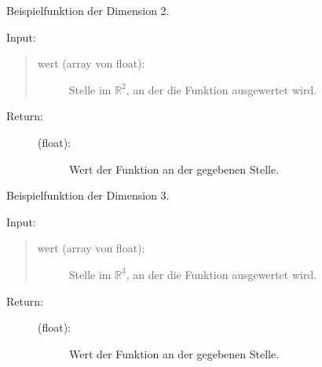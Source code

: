 \documentclass[letterpaper,10pt,ngerman, oneside, openright]{sphinxmanual}
\begin{document}
\begin{fulllineitems}
\label{\detokenize{index:aufg_5_2.fntn2}}
Beispielfunktion der Dimension 2.
\begin{description}
\item [{Input:}]
\end{description}
\begin{quote}
\begin{description}
\item[{wert (array von float):}] \leavevmode
Stelle im $\mathbb{R}^2$, an der die Funktion ausgewertet wird.

\end{description}
\end{quote}
\begin{description}
\item[{Return:}] \leavevmode\begin{description}
\item[{(float):}] \leavevmode
Wert der Funktion an der gegebenen Stelle.

\end{description}

\end{description}

\end{fulllineitems}


\begin{fulllineitems}
\label{\detokenize{index:aufg_5_2.fntn3}}
Beispielfunktion der Dimension 3.
\begin{description}
\item [{Input:}]
\end{description}
\begin{quote}
\begin{description}
\item[{wert (array von float):}] \leavevmode
Stelle im $\mathbb{R}^3$, an der die Funktion ausgewertet wird.

\end{description}
\end{quote}
\begin{description}
\item[{Return:}] \leavevmode\begin{description}
\item[{(float):}] \leavevmode
Wert der Funktion an der gegebenen Stelle.

\end{description}

\end{description}

\end{fulllineitems}
\end{document}
